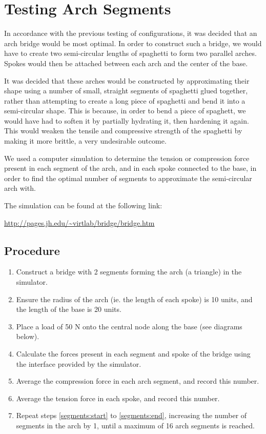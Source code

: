 \documentclass[a4paper,11pt]{article}
\begin{document}
\section{Testing Arch Segments}

In accordance with the previous testing of configurations, it was decided that
an arch bridge would be most optimal.
In order to construct such a bridge, we would have to create two semi-circular
lengths of spaghetti to form two parallel arches. Spokes would then be attached
between each arch and the center of the base.

It was decided that these arches would be constructed by approximating their
shape using a number of small, straight segments of spaghetti glued together,
rather than attempting to create a long piece of spaghetti and bend it into a
semi-circular shape.
This is because, in order to bend a piece of spaghett, we would have had to
soften it by partially hydrating it, then hardening it again.
This would weaken the tensile and compressive strength of the spaghetti by
making it more brittle, a very undesirable outcome.

We used a computer simulation to determine the tension or compression force
present in each segment of the arch, and in each spoke connected to the base,
in order to find the optimal number of segments to approximate the
semi-circular arch with.

The simulation can be found at the following link:

\begin{center}
\url{http://pages.jh.edu/~virtlab/bridge/bridge.htm}
\end{center}


\subsection{Procedure}

\begin{enumerate}
\item \label{segments:start} Construct a bridge with 2 segments forming the
	arch (a triangle) in the simulator.
\item Ensure the radius of the arch (ie. the length of each spoke) is 10 units,
	and the length of the base is 20 units.
\item Place a load of 50 N onto the central node along the base (see diagrams
	below).
\item Calculate the forces present in each segment and spoke of the bridge
	using the interface provided by the simulator.
\item Average the compression force in each arch segment, and record this
	number.
\item \label{segments:end} Average the tension force in each spoke, and record
	this number.
\item Repeat steps \ref{segments:start} to \ref{segments:end}, increasing the
	number of segments in the arch by 1, until a maximum of 16 arch segments is
	reached.
\end{enumerate}
\end{document}
